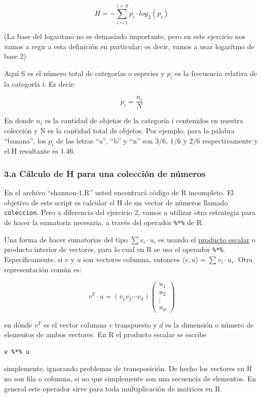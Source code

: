 \documentclass[]{article}
\begin{document}
\[H = - \sum_{i=1}^{i=S} p_i \cdot log_2 (p_i)\]

(La base del logaritmo no es demasiado importante, pero en este
ejercicio nos vamos a regir a esta definición en particular; es decir,
vamos a usar logarítmo de base 2)

Aquí S es el número total de categorías o especies y $p_i$ es la
frecuencia relativa de la categoría i. Es decir:

\[p_i = \frac{n_i}{N}\]

En donde $n_i$ es la cantidad de objetos de la categoría i contenidos en
nuestra colección y N es la cantidad total de objetos. Por ejemplo, para
la palabra ``banana'', los $p_i$ de las letras ``a'', ``b'' y ``n'' son
$3/6$, $1/6$ y $2/6$ respectivamente y el H resultante es 1.46.

\subsubsection{3.a Cálculo de H para una colección de números}

En el archivo ``shannon-1.R'' usted encontrará código de R incompleto.
El objetivo de este script es calcular el H de un vector de números
llamado \texttt{coleccion}. Pero a diferencia del ejercicio 2, vamos a
utilizar otra estrategia para de hacer la sumatoria necesaria, a través
del operador \texttt{\%*\%} de R.

Una forma de hacer sumatorias del tipo $\sum v_i \cdot u_i$ es usando el
\href{https://es.wikipedia.org/wiki/Producto\_escalar}{producto escalar}
o producto interior de vectores, para lo cual en R se usa el operador
\texttt{\%*\%}. Específicamente, si $v$ y $u$ son vectores columna,
entonces $\langle v, u \rangle = \sum v_i \cdot u_i$. Otra
representación común es:

\[v^T \cdot u = (v_1 v_2 \cdots v_d)
  \begin{pmatrix}
    u_1 \\
    u_2 \\
    \vdots \\
    u_d
  \end{pmatrix}
\]

en dónde $v^T$ es el vector columna $v$ transpuesto y $d$ es la
dimensión o número de elementos de ambos vectores. En R el producto
escalar se escribe

\begin{verbatim}
v %*% u
\end{verbatim}
simplemente, ignorando problemas de transposición. De hecho los vectores
en R no son fila o columna, si no que simplemente son una secuencia de
elementos. En general este operador sirve para toda multiplicación de
matrices en R.
\end{document}

